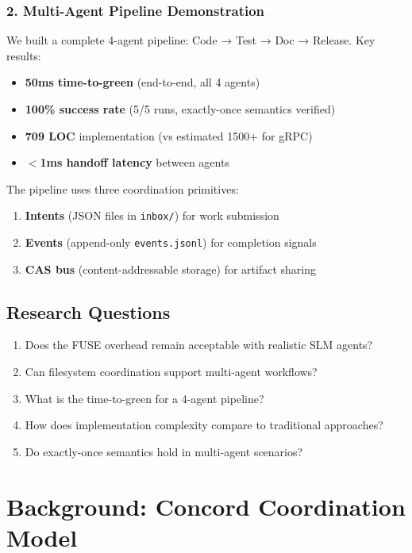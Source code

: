 \documentclass[11pt]{article}
\begin{document}
\subsubsection{2. Multi-Agent Pipeline Demonstration}

We built a complete 4-agent pipeline: Code → Test → Doc → Release. Key results:
\begin{itemize}
\item \textbf{50ms time-to-green} (end-to-end, all 4 agents)
\item \textbf{100\% success rate} (5/5 runs, exactly-once semantics verified)
\item \textbf{709 LOC} implementation (vs estimated 1500+ for gRPC)
\item \textbf{$<$1ms handoff latency} between agents
\end{itemize}

The pipeline uses three coordination primitives:
\begin{enumerate}
\item \textbf{Intents} (JSON files in \texttt{inbox/}) for work submission
\item \textbf{Events} (append-only \texttt{events.jsonl}) for completion signals
\item \textbf{CAS bus} (content-addressable storage) for artifact sharing
\end{enumerate}

\subsection{Research Questions}

\begin{enumerate}
\item Does the FUSE overhead remain acceptable with realistic SLM agents?
\item Can filesystem coordination support multi-agent workflows?
\item What is the time-to-green for a 4-agent pipeline?
\item How does implementation complexity compare to traditional approaches?
\item Do exactly-once semantics hold in multi-agent scenarios?
\end{enumerate}

\section{Background: Concord Coordination Model}
\end{document}
